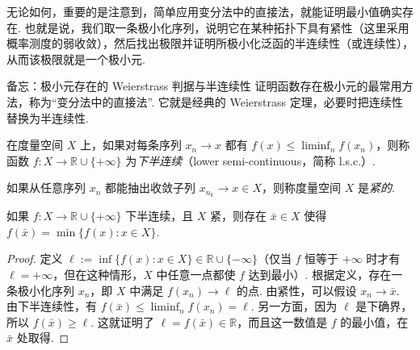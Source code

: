 无论如何，重要的是注意到，简单应用变分法中的直接法，就能证明最小值确实存在. 也就是说，我们取一条极小化序列，说明它在某种拓扑下具有紧性（这里采用概率测度的弱收敛），然后找出极限并证明所极小化泛函的半连续性（或连续性），从而该极限就是一个极小元.

\begin{sourcebox}{备忘：极小元存在的 Weierstrass 判据与半连续性}\label{box:1.1}
证明函数存在极小元的最常用方法，称为“变分法中的直接法”. 它就是经典的 Weierstrass 定理，必要时把连续性替换为半连续性.

\begin{definition*}
在度量空间 $X$ 上，如果对每条序列 $x_n\to x$ 都有 $f(x)\le\liminf_n f(x_n)$，则称函数 $f:X\to\mathbb R\cup\{+\infty\}$ 为\emph{下半连续}（lower semi-continuous，简称 l.s.c.）.
\end{definition*}

\begin{definition*}
如果从任意序列 $x_n$ 都能抽出收敛子列 $x_{n_k}\to x\in X$，则称度量空间 $X$ 是\emph{紧的}.
\end{definition*}

\begin{theorem*}[Weierstrass]
如果 $f:X\to\mathbb R\cup\{+\infty\}$ 下半连续，且 $X$ 紧，则存在 $\bar x\in X$ 使得 $f(\bar x)=\min\{f(x):x\in X\}$.
\end{theorem*}

\begin{proof}
定义 $\ell:=\inf\{f(x):x\in X\}\in\mathbb R\cup\{-\infty\}$（仅当 $f$ 恒等于 $+\infty$ 时才有 $\ell=+\infty$，但在这种情形，$X$ 中任意一点都使 $f$ 达到最小）. 根据定义，存在一条极小化序列 $x_n$，即 $X$ 中满足 $f(x_n)\to\ell$ 的点. 由紧性，可以假设 $x_n\to\bar x$. 由下半连续性，有 $f(\bar x)\le\liminf_n f(x_n)=\ell$. 另一方面，因为 $\ell$ 是下确界，所以 $f(\bar x)\ge\ell$. 这就证明了 $\ell=f(\bar x)\in\mathbb R$，而且这一数值是 $f$ 的最小值，在 $\bar x$ 处取得.
\end{proof}
\end{sourcebox}


